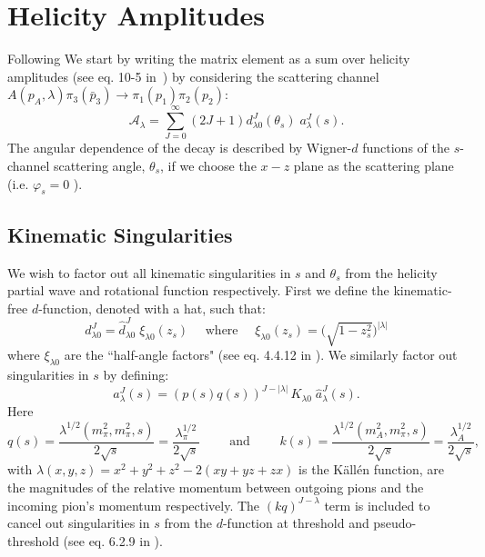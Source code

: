 \documentclass[10pt, aps,prd,amsmath,amssymb,superscriptaddress,onecolumn,
nofootinbib,showpacs,preprintnumbers]{revtex4-1}
\begin{document}
\section{Helicity Amplitudes}
Following \cite{Mikhasenko:2017rkh} We start by writing the matrix element as a sum over helicity amplitudes (see eq. 10-5 in~\cite{perl}) by considering the scattering channel \(A(p_A, \lambda) \pi_3(\bar{p}_3) \to  \pi_1(p_1)\pi_2(p_2)\):
  \begin{equation}
    \label{eq:helicity}
    \mathcal{A}_\lambda = \sum_{J= 0}^\infty (2J +1) d_{\lambda0}^J(\theta_s) \; a_\lambda^J(s).
  \end{equation}
The angular dependence of the decay is described by Wigner-\(d\) functions of the \(s\)-channel scattering angle, \(\theta_s\), if we choose the \(x-z\) plane as the scattering plane (i.e. \(\varphi_s = 0 \) ).
\subsection{Kinematic Singularities}
We wish to factor out all kinematic singularities in \(s\) and \(\theta_s\) from the helicity partial wave and rotational function respectively. First we define the kinematic-free \(d\)-function, denoted with a hat, such that:
  \begin{equation}
      \label{eq:halfangle}
      d^J_{\lambda 0} = \hat{d}^J_{\lambda 0} \; \xi_{\lambda 0}(z_s) \quad \text{ where } \quad \xi_{\lambda 0}(z_s) = \bigg( \sqrt{ 1- z_s^2} \bigg)^{|\lambda|}
  \end{equation}
where \(\xi_{\lambda 0}\) are the ``half-angle factors" (see eq. 4.4.12 in \cite{Collins}). We similarly factor out singularities in \(s\) by defining:
  \begin{equation}
    \label{eq:kinematicfreepartialwave}
    a^J_\lambda(s) = (p(s)q(s))^{J - |\lambda|} \, K_{\lambda 0} \; \hat{a}^J_\lambda(s).
  \end{equation}
Here
  \begin{equation}
    \label{eq:momenta}
    q(s) = \frac{\lambda^{1/2}(m_\pi^2, m_\pi^2, s)}{2\sqrt{s}} = \frac{\lambda_\pi^{1/2}}{2\sqrt{s}} \qquad \text{ and } \qquad k(s) = \frac{\lambda^{1/2}(m_A^2, m_\pi^2, s)}{2\sqrt{s}} = \frac{\lambda_A^{1/2}}{2\sqrt{s}} ,
  \end{equation}
with \(\lambda(x,y,z) = x^2 + y^2 + z^2 - 2 (xy + yz + zx)\) is the K\"{a}ll\'{e}n function, are the magnitudes of  the relative momentum between outgoing pions and the incoming pion's momentum respectively. The \((kq)^{J-\lambda}\) term is included to cancel out singularities in \(s\) from the \(d\)-function at threshold and pseudo-threshold (see eq. 6.2.9 in \cite{Collins}).
\end{document}
